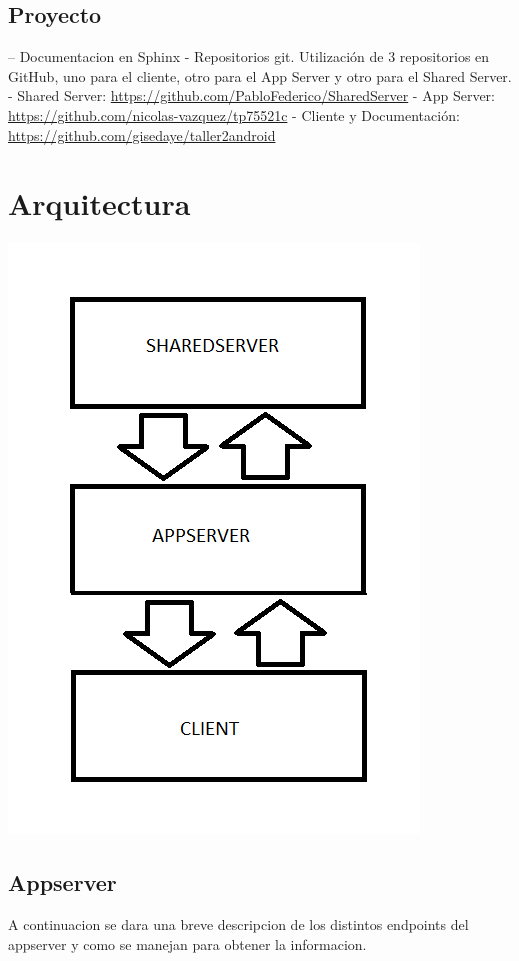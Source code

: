 \documentclass[letterpaper,10pt,english]{sphinxmanual}
\begin{document}
\subsection{Proyecto}
\label{manuals:proyecto}
-- Documentacion en Sphinx
- Repositorios git. Utilización de 3 repositorios en GitHub, uno para el cliente, otro para el App Server y otro para el Shared Server.
- Shared Server: \href{https://github.com/PabloFederico/SharedServer}{https://github.com/PabloFederico/SharedServer}
- App Server: \href{https://github.com/nicolas-vazquez/tp75521c}{https://github.com/nicolas-vazquez/tp75521c}
- Cliente y Documentación: \href{https://github.com/gisedaye/taller2android}{https://github.com/gisedaye/taller2android}


\section{Arquitectura}
\label{manuals:arquitectura}
\includegraphics{architecture.png}


\subsection{Appserver}
\label{manuals:appserver}
A continuacion se dara una breve descripcion de los distintos endpoints del appserver y como se manejan para obtener la informacion.
\end{document}
